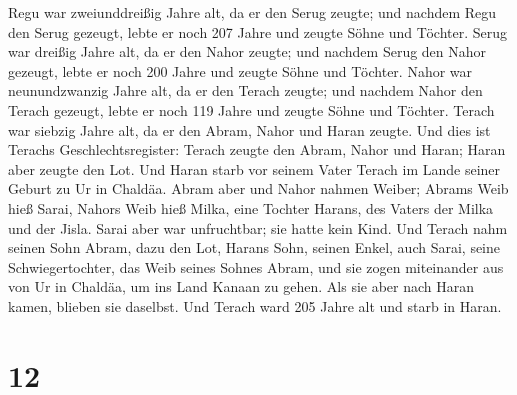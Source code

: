  Regu war zweiunddreißig Jahre alt, da er den Serug
zeugte;  und nachdem Regu den Serug gezeugt, lebte er
noch 207 Jahre und zeugte Söhne und Töchter.  Serug war
dreißig Jahre alt, da er den Nahor zeugte;  und nachdem
Serug den Nahor gezeugt, lebte er noch 200 Jahre und zeugte Söhne und
Töchter.  Nahor war neunundzwanzig Jahre alt, da er den
Terach zeugte;  und nachdem Nahor den Terach gezeugt,
lebte er noch 119 Jahre und zeugte Söhne und Töchter. 
Terach war siebzig Jahre alt, da er den Abram, Nahor und Haran zeugte.
 Und dies ist Terachs Geschlechtsregister: Terach zeugte
den Abram, Nahor und Haran; Haran aber zeugte den Lot. 
Und Haran starb vor seinem Vater Terach im Lande seiner Geburt zu Ur in
Chaldäa.  Abram aber und Nahor nahmen Weiber; Abrams Weib
hieß Sarai, Nahors Weib hieß Milka, eine Tochter Harans, des Vaters der
Milka und der Jisla.  Sarai aber war unfruchtbar; sie
hatte kein Kind.  Und Terach nahm seinen Sohn Abram, dazu
den Lot, Harans Sohn, seinen Enkel, auch Sarai, seine Schwiegertochter,
das Weib seines Sohnes Abram, und sie zogen miteinander aus von Ur in
Chaldäa, um ins Land Kanaan zu gehen. Als sie aber nach Haran kamen,
blieben sie daselbst.  Und Terach ward 205 Jahre alt und
starb in Haran.

\hypertarget{section-11}{%
\section{12}\label{section-11}}

